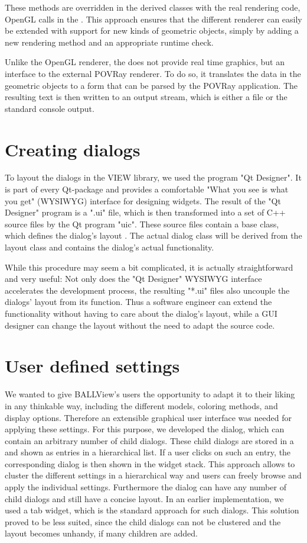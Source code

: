 These methods are overridden in the derived classes with the real rendering
code, \eg OpenGL calls in the . 
This approach ensures that the different renderer can easily be extended with support for 
new kinds of geometric objects, simply by adding a new rendering method and an appropriate 
runtime check.

Unlike the OpenGL renderer, the  does not provide real time graphics,
but an interface to the external POVRay renderer.
To do so, it translates the data in the geometric objects to a form that can be 
parsed by the POVRay application. 
The resulting text is then written to an output stream, which is either a
file or the standard console output.

\section{Creating dialogs}
\label{designer}
To layout the dialogs in the VIEW library, we used the program "Qt Designer".
It is part of every Qt-package and provides a comfortable "What you see is what you get"
(WYSIWYG) interface for designing widgets.
The result of the "Qt Designer" program is a ".ui" file, which is then transformed 
into a set of C++ source files by the Qt program "uic".
These source files contain a base class, which defines the dialog's layout . 
The actual dialog class will be derived from the layout class and contains the dialog's
actual functionality.

While this procedure may seem a bit complicated, it is actually straightforward and 
very useful:
Not only does the "Qt Designer" WYSIWYG interface accelerates the development process, 
the resulting "*.ui" files also uncouple the dialogs' layout from its function. 
Thus a software engineer can extend the functionality without 
having to care about the dialog's layout, while a GUI designer can change the layout
without the need to adapt the source code.

\section{User defined settings}
\label{preferences}
We wanted to give BALLView's users the opportunity to adapt it to their liking in any
thinkable way, including the different models, coloring methods, and display options. 
Therefore an extensible graphical user interface was needed for applying these settings. 
For this purpose, we developed the  dialog, which can contain an 
arbitrary number of child dialogs. 
These child dialogs are stored in a  and shown as entries in 
a hierarchical list. 
If a user clicks on such an entry, the corresponding dialog is then shown in the 
widget stack.
This approach allows to cluster the different settings in a hierarchical way
and users can freely browse and apply the individual settings.
Furthermore the  dialog can have any number of child dialogs and still 
have a concise layout.
In an earlier implementation, we used a tab widget, which is the standard approach for
such dialogs. This solution proved to be less suited, since the child dialogs can not
be clustered and the layout becomes unhandy, if many children are added.

